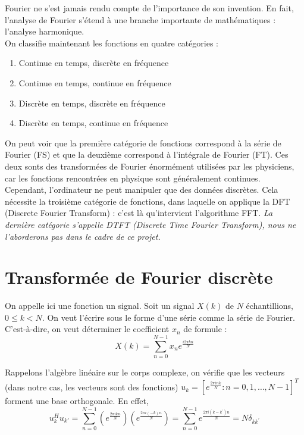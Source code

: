 \documentclass{report}
\begin{document}
		Fourier ne s'est jamais rendu compte de l'importance de son invention. En fait, l'analyse de Fourier s'étend à une branche importante de mathématiques : l'analyse harmonique.\\
		On classifie maintenant les fonctions en quatre catégories :
		\begin{enumerate}
		\item Continue en temps, discrète en fréquence\\
		\item Continue en temps, continue en fréquence\\
		\item Discrète en temps, discrète en fréquence\\
		\item Discrète en temps, continue en fréquence\\
		\end{enumerate}
		On peut voir que la première catégorie de fonctions correspond à la série de Fourier (FS) et que la deuxième correspond à l'intégrale de Fourier (FT). Ces deux sonts des transformées de Fourier énormément utilisées par les physiciens, car les fonctions rencontrées en physique sont généralement continues.\\
		Cependant, l'ordinateur ne peut manipuler que des données discrètes. Cela nécessite la troisième catégorie de fonctions, dans laquelle on applique la DFT (Discrete Fourier Transform) : c'est là qu'intervient l'algorithme FFT. \textit{La dernière catégorie s'appelle DTFT (Discrete Time Fourier Transform), nous ne l'aborderons pas dans le cadre de ce projet.}

	\section{Transformée de Fourier discrète}
		On appelle ici une fonction un signal. Soit un signal $X(k)$ de $N$ échantillions, $0\leq k<N $. On veut l'écrire sous le forme d'une série comme la série de Fourier. C'est-à-dire, on veut déterminer le coefficient $x_n$ de formule :
		\begin{displaymath}
			X(k)=\sum_{n=0}^{N-1}x_ne^{\frac{i2\pi kn}{N}}
		\end{displaymath}

		Rappelons l'algèbre linéaire sur le corps complexe, on vérifie que les 
		vecteurs (dans notre cas, les vecteurs sont des fonctions) $u_k=[e^{\frac{2\pi ink}{N}}:n=0,1,\ldots,N-1]^T $ forment une base orthogonale. En effet,
		\begin{displaymath}
			u_k^H u_{k'}	= \sum_{n=0}^{N-1}(e^\frac{2\pi ikn}{N})(e^\frac{2\pi i(-k)n}{N})
							= \sum_{n=0}^{N-1}e^\frac{2\pi i(k-k^{'})n}{N}
							= N\delta_{kk^{'}}
		\end{displaymath}
\end{document}
